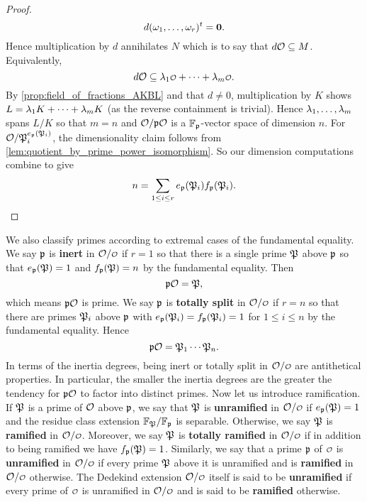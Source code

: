 \begin{proof}
      \[
        d(\omega_{1},\ldots,\omega_{r})^{t} = \mathbf{0}.
      \]
      Hence multiplication by $d$ annihilates $N$ which is to say that $d\mathcal{O} \subseteq M$. Equivalently,
      \[
        d\mc{O} \subseteq \l_{1}\smc{O}+\cdots+\l_{m}\smc{O}.
      \]
      By \cref{prop:field_of_fractions_AKBL} and that $d \neq 0$, multiplication by $K$ shows $L = \lambda_{1}K+\cdots+\lambda_{m}K$ (as the reverse containment is trivial). Hence $\lambda_{1},\ldots,\lambda_{m}$ spans $L/K$ so that $m = n$ and $\mathcal{O}/\mathfrak{p}\mathcal{O}$ is a $\mathbb{F}_{\mathfrak{p}}$-vector space of dimension $n$. For $\mathcal{O}/\mathfrak{P}_{i}^{e_{\mathfrak{p}}(\mathfrak{P}_{i})}$, the dimensionality claim follows from \cref{lem:quotient_by_prime_power_isomorphism}. So our dimension computations combine to give
      \[
        n = \sum_{1 \le i \le r}e_{\mathfrak{p}}(\mathfrak{P}_{i})f_{\mathfrak{p}}(\mathfrak{P}_{i}).
      \]
    \end{proof}

    We also classify primes according to extremal cases of the fundamental equality. We say $\mathfrak{p}$ is \textbf{inert} in $\mc{O}/\smc{O}$ if $r = 1$ so that there is a single prime $\mathfrak{P}$ above $\mathfrak{p}$ so that $e_{\mathfrak{p}}(\mathfrak{P}) = 1$ and $f_{\mathfrak{p}}(\mathfrak{P}) = n$ by the fundamental equality. Then
    \[
      \mathfrak{p}\mathcal{O} = \mathfrak{P},
    \]
    which means $\mathfrak{p}\mathcal{O}$ is prime. We say $\mathfrak{p}$ is \textbf{totally split} in $\mc{O}/\smc{O}$ if $r = n$ so that there are primes $\mathfrak{P}_{i}$ above $\mathfrak{p}$ with $e_{\mathfrak{p}}(\mathfrak{P}_{i}) = f_{\mathfrak{p}}(\mathfrak{P}_{i}) = 1$ for $1 \le i \le n$ by the fundamental equality. Hence
    \[
      \mathfrak{p}\mathcal{O} = \mathfrak{P}_{1} \cdots \mathfrak{P}_{n}.
    \]
    In terms of the inertia degrees, being inert or totally split in $\mc{O}/\smc{O}$ are antithetical properties. In particular, the smaller the inertia degrees are the greater the tendency for $\mathfrak{p}\mathcal{O}$ to factor into distinct primes. Now let us introduce ramification. If $\mathfrak{P}$ is a prime of $\mathcal{O}$ above $\mathfrak{p}$, we say that $\mathfrak{P}$ is \textbf{unramified} in $\mc{O}/\smc{O}$ if $e_{\mathfrak{p}}(\mathfrak{P}) = 1$ and the residue class extension $\mathbb{F}_{\mathfrak{P}}/\mathbb{F}_{\mathfrak{p}}$ is separable. Otherwise, we say $\mathfrak{P}$ is \textbf{ramified} in $\mc{O}/\smc{O}$. Moreover, we say $\mathfrak{P}$ is \textbf{totally ramified} in $\mc{O}/\smc{O}$ if in addition to being ramified we have $f_{\mathfrak{p}}(\mathfrak{P}) = 1$. Similarly, we say that a prime $\mathfrak{p}$ of $\smc{O}$ is \textbf{unramified} in $\mc{O}/\smc{O}$ if every prime $\mathfrak{P}$ above it is unramified and is \textbf{ramified} in $\mc{O}/\smc{O}$ otherwise. The Dedekind extension $\mc{O}/\smc{O}$ itself is said to be \textbf{unramified} if every prime of $\smc{O}$ is unramified in $\mc{O}/\smc{O}$ and is said to be \textbf{ramified} otherwise.


